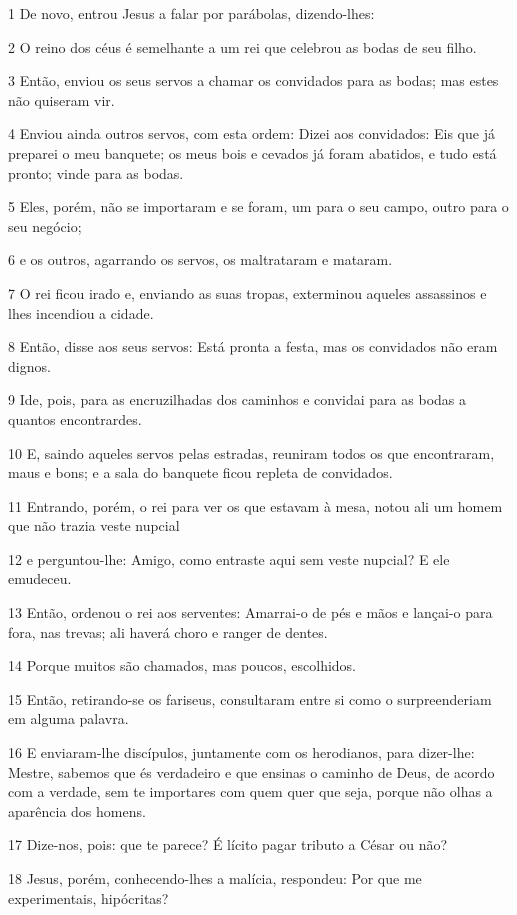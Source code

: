 \par 1 De novo, entrou Jesus a falar por parábolas, dizendo-lhes:
\par 2 O reino dos céus é semelhante a um rei que celebrou as bodas de seu filho.
\par 3 Então, enviou os seus servos a chamar os convidados para as bodas; mas estes não quiseram vir.
\par 4 Enviou ainda outros servos, com esta ordem: Dizei aos convidados: Eis que já preparei o meu banquete; os meus bois e cevados já foram abatidos, e tudo está pronto; vinde para as bodas.
\par 5 Eles, porém, não se importaram e se foram, um para o seu campo, outro para o seu negócio;
\par 6 e os outros, agarrando os servos, os maltrataram e mataram.
\par 7 O rei ficou irado e, enviando as suas tropas, exterminou aqueles assassinos e lhes incendiou a cidade.
\par 8 Então, disse aos seus servos: Está pronta a festa, mas os convidados não eram dignos.
\par 9 Ide, pois, para as encruzilhadas dos caminhos e convidai para as bodas a quantos encontrardes.
\par 10 E, saindo aqueles servos pelas estradas, reuniram todos os que encontraram, maus e bons; e a sala do banquete ficou repleta de convidados.
\par 11 Entrando, porém, o rei para ver os que estavam à mesa, notou ali um homem que não trazia veste nupcial
\par 12 e perguntou-lhe: Amigo, como entraste aqui sem veste nupcial? E ele emudeceu.
\par 13 Então, ordenou o rei aos serventes: Amarrai-o de pés e mãos e lançai-o para fora, nas trevas; ali haverá choro e ranger de dentes.
\par 14 Porque muitos são chamados, mas poucos, escolhidos.
\par 15 Então, retirando-se os fariseus, consultaram entre si como o surpreenderiam em alguma palavra.
\par 16 E enviaram-lhe discípulos, juntamente com os herodianos, para dizer-lhe: Mestre, sabemos que és verdadeiro e que ensinas o caminho de Deus, de acordo com a verdade, sem te importares com quem quer que seja, porque não olhas a aparência dos homens.
\par 17 Dize-nos, pois: que te parece? É lícito pagar tributo a César ou não?
\par 18 Jesus, porém, conhecendo-lhes a malícia, respondeu: Por que me experimentais, hipócritas?
